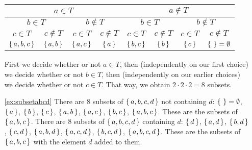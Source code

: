 \begin{enumerate}
\begin{tabular}{|c|c|c|c|c|c|c|c|}
\hline
\multicolumn{4}{|c|}{$a \in T$} & \multicolumn{4}{|c|}{$a \notin T$} \\
\hline
\multicolumn{2}{|c|}{$b \in T$} & \multicolumn{2}{|c|}{$b \notin T$} & \multicolumn{2}{|c|}{$b \in T$} & \multicolumn{2}{|c|}{$b \notin T$}\\
\hline
$c \in T$ & $c \notin T$ & $c \in T$ & $c \notin T$ & $c \in T$ & $c \notin T$ & $c \in T$ & $c \notin T$ \\
\hline
$\left\{\,a, b, c\,\right\}$ & $\left\{\,a, b\,\right\}$ & $\left\{\,a, c\,\right\}$ & $\left\{\,a\,\right\}$ & $\left\{\,b, c\,\right\}$ & $\left\{\,b\,\right\}$ & $\left\{\,c\,\right\}$ & $\left\{\,\,\right\} = \emptyset $ \\
\hline
\end{tabular}

First we decide whether or not $a \in T$, 
then (independently on our first choice) we decide whether or not $b \in T$,
then (independently on our earlier choices) we decide whether or not $c \in T$.
That way, we obtain $2 \cdot 2 \cdot 2 = 8$ subsets. 

\item[\ref{ex:subsetabcd}]
There are 8 subsets of $\left\{\,a, b, c, d\,\right\}$ not containing $d$: 
$\left\{\,\,\right\} = \emptyset$, 
$\left\{\,a\,\right\}$, $\left\{\,b\,\right\}$, $\left\{\,c\,\right\}$, 
$\left\{\,a, b\,\right\}$, $\left\{\,a, c\,\right\}$, $\left\{\,b, c\,\right\}$, 
$\left\{\,a, b, c\,\right\}$. 
These are the subsets of $\left\{\,a, b, c\,\right\}$. 
There are 8 subsets of $\left\{\,a, b, c, d\,\right\}$ containing $d$: 
$\left\{\,d\,\right\}$, $\left\{\,a, d\,\right\}$, $\left\{\,b, d\,\right\}$, $\left\{\,c, d\,\right\}$, 
$\left\{\,a, b, d\,\right\}$, $\left\{\,a, c, d\,\right\}$, $\left\{\,b, c, d\,\right\}$, 
$\left\{\,a, b, c, d\,\right\}$. 
These are the subsets of $\left\{\,a, b, c\,\right\}$ with the element $d$ added to them. 



\end{enumerate}
